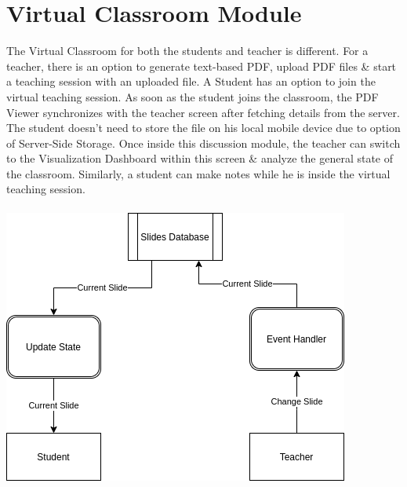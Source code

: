 \documentclass[10pt]{report}
\begin{document}
\section{Virtual Classroom Module}
The Virtual Classroom for both the students and teacher is different. For a teacher, there is an option to generate text-based PDF, upload PDF files \& start a teaching session with an uploaded file. A Student has an option to join the virtual teaching session. As soon as the student joins the classroom, the PDF Viewer synchronizes with the teacher screen after fetching details from the server. The student doesn't need to store the file on his local mobile device due to option of Server-Side Storage. Once inside this discussion module, the teacher can switch to the Visualization Dashboard within this screen \& analyze the general state of the classroom. Similarly, a student can make notes while he is inside the virtual teaching session. 
\\ \\
\includegraphics[width=\textwidth]{LiveClassroom.png}
\end{document}
